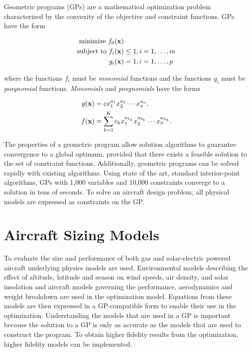 \documentclass[]{aiaa-tc}%
\begin{document}
Geometric programs (GPs) are a mathematical optimization problem characterized by the convexity of the objective and constraint functions. GPs have the form

\begin{align} 
\label{e:gpform}
\text{minimize } f_0(\bold{x}) & \nonumber \\
\text{subject to  } f_i(\bold{x}) &\leq 1, i=1,\ldots,m \\
g_i (\bold{x}) &= 1, i = 1,\ldots,p \nonumber 
\end{align}

where the functions $f_i$ must be \emph{monomial} functions and the functions $g_i$ must be \emph{posynomial} functions. \emph{Monomials} and \emph{posynomials} have the forms

\begin{align}
 \label{e:mon}
g(\bold{x}) &= c x_1^{a_1} x_2^{a_2} \dotsm x_n^{a_n} , \\
\label{e:pos}
f(\bold{x}) &= \displaystyle\sum_{k=1}^K c_k x_1^{a_{1_k}} x_2^{a_{2_k}} \dotsm x_n^{a_{n_k}}.
\end{align}

The properties of a geometric program allow solution algorithms to guarantee convergence to a global optimum, provided that there exists a feasible solution to the set of constraint functions.  
Additionally, geometric programs can be solved rapidly with existing algorithms.  
Using state of the art, standard interior-point algorithms, GPs with 1,000 variables and 10,000 constraints converge to a solution in tens of seconds.\cite{gp}  
To solve an aircraft design problem, all physical models are expressed as constraints on the GP.\cite{hoburgthesis} \\

\section{Aircraft Sizing Models}

To evaluate the size and performance of both gas and solar-electric powered aircraft underlying physics models are used.  
Environmental models describing the effect of altitude, latitude and season on wind speeds, air density, and solar insolation and aircraft models governing the performance, aerodynamics and weight breakdown are used in the optimization model.
Equations from these models are then expressed in a GP-compatible form to enable their use in the optimization. 
Understanding the models that are used in a GP is important because the solution to a GP is only as accurate as the models that are used to construct the program.  
To obtain higher fidelity results from the optimization, higher fidelity models can be implemented. 
\end{document}
